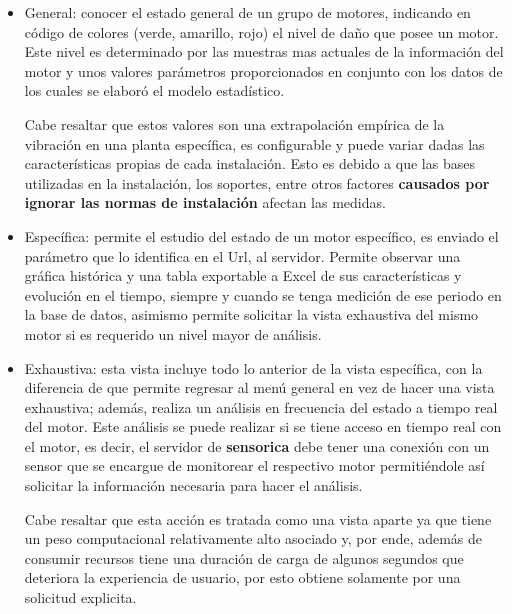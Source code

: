 \begin{itemize}
    \item General: conocer el estado general de un grupo de motores, indicando
        en código de colores (verde, amarillo, rojo) el nivel de daño que posee
        un motor. Este nivel es determinado por las muestras mas actuales de
        la información del motor y unos valores parámetros proporcionados en
        conjunto con los datos de los cuales se elaboró el modelo estadístico.

        Cabe resaltar que estos valores son una extrapolación empírica de la
        vibración en una planta específica, es configurable y puede variar dadas
        las características propias de cada instalación. Esto es debido a que
        las bases utilizadas en la instalación, los soportes, entre otros factores
        \textbf{causados por ignorar las normas de instalación} afectan las medidas.

    \item Específica:  permite el estudio del estado de un motor específico,
        es enviado el parámetro que lo identifica en el Url, al servidor.
        Permite observar
        una gráfica histórica y una tabla exportable a Excel de sus características y
        evolución en el tiempo, siempre y cuando se tenga medición de ese periodo
        en la base de datos, asimismo permite solicitar la vista exhaustiva del
        mismo motor si es requerido un nivel mayor de análisis.

    \item Exhaustiva: esta vista incluye todo lo anterior de la vista específica,
        con la diferencia de que permite regresar al menú general en vez de hacer
        una vista exhaustiva; además, realiza un análisis en frecuencia
        del estado a tiempo real del motor. Este análisis se puede realizar si
        se tiene acceso en tiempo real con el motor, es decir,
        el servidor de \textbf{sensorica} debe tener una conexión con un sensor que se
        encargue de monitorear el respectivo motor permitiéndole así solicitar
        la información necesaria para hacer el análisis.

        Cabe resaltar que esta acción es tratada como una vista aparte ya que
        tiene un peso computacional relativamente alto asociado y, por ende,
        además de consumir recursos tiene una duración de carga de algunos
        segundos que deteriora la experiencia de usuario, por esto
        obtiene solamente por una solicitud explicita.
\end{itemize}





